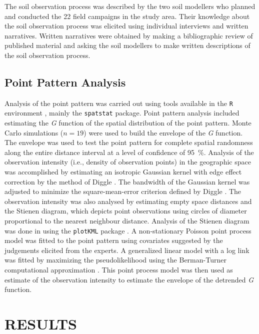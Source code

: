 The soil observation process was described by the two soil modellers who planned and conducted the 22 field 
campaigns in the study area. Their knowledge about the soil observation process was elicited using individual 
interviews and written narratives. Written narratives were obtained by making a bibliographic review of 
published 
material and asking the soil modellers to make written descriptions of the soil observation process.

\subsection{Point Pattern Analysis}

Analysis of the point pattern was carried out using tools available in the \texttt{R} environment 
\cite{R2013}, mainly the \texttt{spatstat} \cite{Baddeley2010} package. Point pattern analysis included 
estimating the \emph{G} function of the spatial distribution of the point pattern. Monte Carlo simulations ($n 
= 19$) were used to build the envelope of the \emph{G} function. The envelope was used to test the point 
pattern for complete spatial randomness along the entire distance interval at a level of confidence of 
\SI{95}{\percent}. Analysis of the observation intensity (i.e., density of observation points) in the 
geographic space was accomplished by estimating 
an isotropic Gaussian kernel with edge effect correction by the method of Diggle \cite{Diggle1985}. The 
bandwidth of the Gaussian kernel was adjusted to minimize the square-mean-error criterion defined by Diggle 
\cite{Diggle1985}. The observation intensity was also analysed by estimating empty space distances and the 
Stienen diagram, which depicts point observations using circles of diameter proportional to the nearest 
neighbour distance. Analysis of the Stienen diagram was done in \googleearth{} using the \texttt{plotKML} 
package \cite{Hengl2013}. A non-stationary Poisson point process model was fitted to the point pattern using 
covariates suggested by the judgements elicited from the experts. A generalized linear model with a log link 
was fitted by maximizing the pseudolikelihood using the Berman-Turner computational approximation 
\cite{Baddeley2010}. This point process model was then used as estimate of the observation intensity to 
estimate the envelope of the detrended \emph{G} function.

\section{RESULTS}

